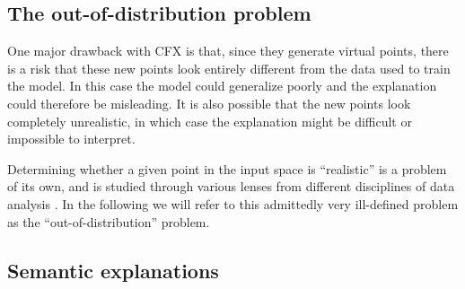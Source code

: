 \documentclass[../main.tex]{subfiles}
\begin{document}
\subsection{The out-of-distribution problem}

One major drawback with CFX is that, since they generate virtual points, there is a risk that these new points look entirely different from the data used to train the model.
In this case the model could generalize poorly and the explanation could therefore be misleading.
It is also possible that the new points look completely unrealistic, in which case the explanation might be difficult or impossible to interpret.


Determining whether a given point in the input space is ``realistic'' is a problem of its own, and is studied through various lenses from different disciplines of data analysis \cite{yangGeneralized2022}.
In the following we will refer to this admittedly very ill-defined problem as the ``out-of-distribution'' problem.

\subsection{Semantic explanations}
\end{document}
